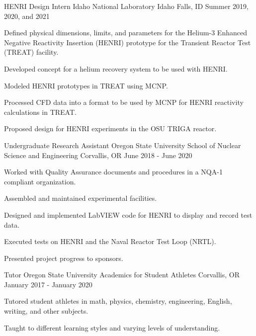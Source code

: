 
\begin{cventries}
  \cventry
    {HENRI Design Intern} %
    {Idaho National Laboratory} %
    {Idaho Falls, ID} %
    {Summer 2019, 2020, and 2021} %
    {
      \begin{cvitems} %
        \item {Defined physical dimensions, limits, and parameters for the Helium-3 Enhanced Negative Reactivity Insertion (HENRI) prototype for the Transient Reactor Test (TREAT) facility.}
        \item{Developed concept for a helium recovery system to be used with HENRI.}
        \item{Modeled HENRI prototypes in TREAT using MCNP.}
        \item{Processed CFD data into a format to be used by MCNP for HENRI reactivity calculations in TREAT.}
        \item{Proposed design for HENRI experiments in the OSU TRIGA reactor.}
      \end{cvitems}
    }

  \cventry
    {Undergraduate Research Assistant} %
    {Oregon State University School of Nuclear Science and Engineering} %
    {Corvallis, OR} %
    {June 2018 - June 2020} %
    {
      \begin{cvitems} %
        \item {Worked with Quality Assurance documents and procedures in a NQA-1 compliant organization.}
        \item{Assembled and maintained experimental facilities.}
        \item{Designed and implemented LabVIEW code for HENRI to display and record test data.}
        \item{Executed tests on HENRI and the Naval Reactor Test Loop (NRTL).}
        \item{Presented project progress to sponsors.}
      \end{cvitems}
    }

  \cventry
    {Tutor} %
    {Oregon State University Academics for Student Athletes} %
    {Corvallis, OR} %
    {January 2017 - January 2020} %
    {
      \begin{cvitems} %
        \item {Tutored student athletes in math, physics, chemistry, engineering, English, writing, and other subjects.}
        \item{Taught to different learning styles and varying levels of understanding.}
      \end{cvitems}
    }


\end{cventries}
